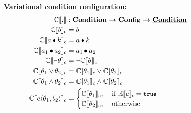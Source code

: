 \begin{figure}
\textbf{Variational condition configuration:}
\begin{alignat*}{1}
\ecSem [] . &: \vCondSet \totype \confSet \totype \pCondSet\\
%
\ecSem \bTag &= \bTag \\
%
\ecSem \vAttOpCte &= 
    \vAttOpCte\\
%
\ecSem \vAttOpAtt &= 
       \vAttOpAtt\\
%
\ecSem {\neg \vCond} &= \neg \ecSem \vCond\\
%
\ecSem {\orr \vCond} &= \ecSem {\vCond_1} \vee \ecSem {\vCond_2}\\
%
\ecSem {\annd \vCond} &= \ecSem {\vCond_1} \wedge \ecSem {\vCond_2}\\
%
\ecSem {\chc {\vCond_1, \vCond_2}} &=
	\begin{cases}
		\ecSem {\vCond_1}, &\text{ if } \fSem \dimMeta  = \t \\
		\ecSem {\vCond_2}, &\text{ otherwise}
	\end{cases}
\end{alignat*}
%


\end{figure}
